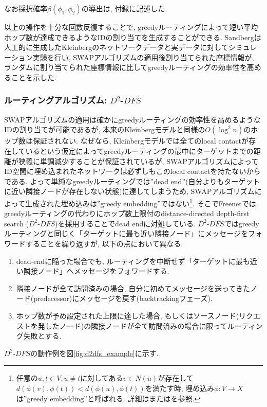 \documentclass[dvipdfmx]{ampbt}
\begin{document}
   なお採択確率$\beta(\phi_1,\phi_2)$の導出は, 付録に記述した.

   以上の操作を十分な回数反復することで, greedyルーティングによって短い平均ホップ数が達成できるようなIDの割り当てを生成することができる. Sandbergは人工的に生成したKleinbergのネットワークデータと実データに対してシミュレーション実験を行い, SWAPアルゴリズムの適用後割り当てられた座標情報が, ランダムに割り当てられた座標情報に比してgreedyルーティングの効率性を高めることを示した.

   \subsubsection{ルーティングアルゴリズム: $D^2$-$DFS$} \label{sec:d2dfs}
   SWAPアルゴリズムの適用は確かにgreedyルーティングの効率性を高めるようなIDの割り当てが可能であるが, 本来のKleinbergモデルと同様の$O(\log^2n)$のホップ数は保証されない. なぜなら, Kleinbergモデルでは全てのlocal contactが存在しているという仮定によってgreedyルーティングの最中にターゲットまでの距離が狭義に単調減少することが保証されているが, SWAPアルゴリズムによってID空間に埋め込まれたネットワークは必ずしもこのlocal contactを持たないからである. よって単純なgreedyルーティングでは''dead end''(自分よりもターゲットに近い隣接ノードが存在しない状態)に達してしまうため, SWAPアルゴリズムによって生成された埋め込みは''greedy embedding''ではない\footnote{任意の$u,t \in V, u\neq t$に対してある$v \in N(u)$が存在して$d(\phi(v), \phi(t)) < d(\phi(u), \phi(t))$を満たす時, 埋め込み$\phi:V \to X$は''greedy embedding''と呼ばれる. 詳細は\cite{papadimitriou2005conjecture}または\cite{kleinberg2007geographic}を参照.}. そこでFreenetではgreedyルーティングの代わりにホップ数上限付のdistance-directed depth-first search ($D^2$-$DFS$)を採用することでdead endに対処している\cite{clarke2001freenet}\cite{clarke2010private}. $D^2$-$DFS$ではgreedyルーティングと同じく「ターゲットに最も近い隣接ノード」にメッセージをフォワードすることを繰り返すが, 以下の点において異なる.
   \begin{enumerate}
    \item dead-endに陥った場合でも, ルーティングを中断せず「ターゲットに最も近い隣接ノード」へメッセージをフォワードする. 
    \item 隣接ノードが全て訪問済みの場合, 自分に初めてメッセージを送ってきたノード(predecessor)にメッセージを戻す(backtrackingフェーズ).
    \item ホップ数が予め設定された上限に達した場合, もしくはソースノード(リクエストを発したノード)の隣接ノードが全て訪問済みの場合に限ってルーティング失敗とする.
   \end{enumerate}
   $D^2$-$DFS$の動作例を図\ref{fig:d2dfs_example}に示す.
\end{document}
